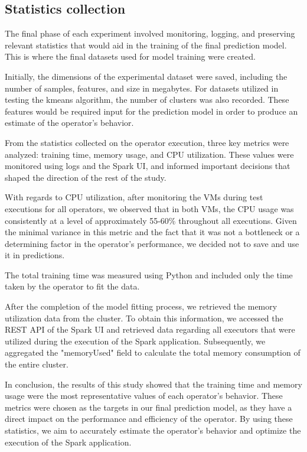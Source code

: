 \documentclass[conference]{IEEEtran}
\begin{document}
\subsection{Statistics collection}
The final phase of each experiment involved monitoring, logging, and preserving relevant statistics that would aid in the training of the final prediction model. This is where the final datasets used for model training were created.
\par
Initially, the dimensions of the experimental dataset were saved, including the number of samples, features, and size in megabytes. For datasets utilized in testing the kmeans algorithm, the number of clusters was also recorded. These features would be required input for the prediction model in order to produce an estimate of the operator's behavior.
\par
From the statistics collected on the operator execution, three key metrics were analyzed: training time, memory usage, and CPU utilization. These values were monitored using logs and the Spark UI, and informed important decisions that shaped the direction of the rest of the study.
\par
With regards to CPU utilization, after monitoring the VMs during test executions for all operators, we observed that in both VMs, the CPU usage was consistently at a level of approximately 55-60\% throughout all executions. Given the minimal variance in this metric and the fact that it was not a bottleneck or a determining factor in the operator's performance, we decided not to save and use it in predictions.
\par
The total training time was measured using Python and included only the time taken by the operator to fit the data.
\par
After the completion of the model fitting process, we retrieved the memory utilization data from the cluster. To obtain this information, we accessed the REST API of the Spark UI and retrieved data regarding all executors that were utilized during the execution of the Spark application. Subsequently, we aggregated the "memoryUsed" field to calculate the total memory consumption of the entire cluster.
\par
In conclusion, the results of this study showed that the training time and memory usage were the most representative values of each operator's behavior. These metrics were chosen as the targets in our final prediction model, as they have a direct impact on the performance and efficiency of the operator. By using these statistics, we aim to accurately estimate the operator's behavior and optimize the execution of the Spark application. 
\end{document}
